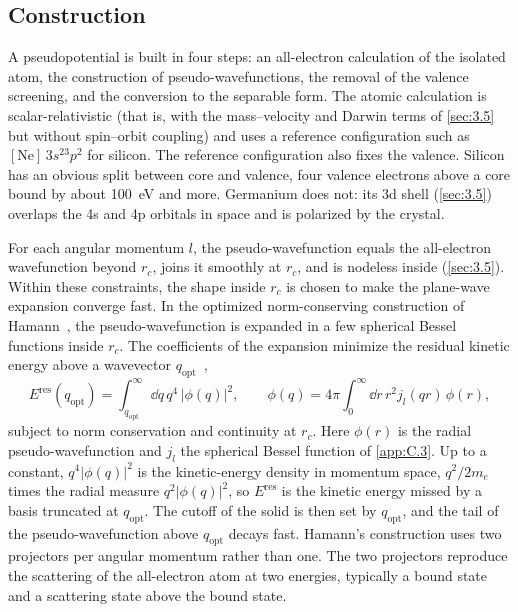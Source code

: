 \subsection{Construction}

A pseudopotential is built in four steps: an all-electron calculation of the isolated atom, the construction of pseudo-wavefunctions, the removal of the valence screening, and the conversion to the separable form. The atomic calculation is scalar-relativistic (that is, with the mass--velocity and Darwin terms of \cref{sec:3.5} but without spin--orbit coupling) and uses a reference configuration such as $[\mathrm{Ne}]\,3s^23p^2$ for silicon. The reference configuration also fixes the valence. Silicon has an obvious split between core and valence, four valence electrons above a core bound by about \SI{100}{eV} and more. Germanium does not: its 3d shell (\cref{sec:3.5}) overlaps the 4s and 4p orbitals in space and is polarized by the crystal.

For each angular momentum $l$, the pseudo-wavefunction equals the all-electron wavefunction beyond $r_c$, joins it smoothly at $r_c$, and is nodeless inside (\cref{sec:3.5}). Within these constraints, the shape inside $r_c$ is chosen to make the plane-wave expansion converge fast. In the optimized norm-conserving construction of Hamann~\cite{hamann2013optimized}, the pseudo-wavefunction is expanded in a few spherical Bessel functions inside $r_c$. The coefficients of the expansion minimize the residual kinetic energy above a wavevector $q_{\mathrm{opt}}$~\cite[Eq.~(1)]{hamann2013optimized},
\begin{equation}
  E^{\mathrm{res}}(q_{\mathrm{opt}}) = \int_{q_{\mathrm{opt}}}^\infty\dd q\,q^4\,|\phi(q)|^2 , \qquad \phi(q) = 4\pi\int_0^\infty\dd r\,r^2j_l(qr)\,\phi(r) ,
  \label{eq:E.2-residual}
\end{equation}
subject to norm conservation and continuity at $r_c$. Here $\phi(r)$ is the radial pseudo-wavefunction and $j_l$ the spherical Bessel function of \cref{app:C.3}. Up to a constant, $q^4|\phi(q)|^2$ is the kinetic-energy density in momentum space, $q^2/2m_e$ times the radial measure $q^2|\phi(q)|^2$, so $E^{\mathrm{res}}$ is the kinetic energy missed by a basis truncated at $q_{\mathrm{opt}}$. The cutoff of the solid is then set by $q_{\mathrm{opt}}$, and the tail of the pseudo-wavefunction above $q_{\mathrm{opt}}$ decays fast. Hamann's construction uses two projectors per angular momentum rather than one. The two projectors reproduce the scattering of the all-electron atom at two energies, typically a bound state and a scattering state above the bound state.

